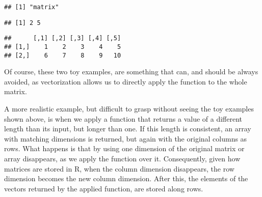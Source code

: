 \documentclass[krantz2]{krantz}\usepackage{knitr}%
\begin{document}
\begin{explainbox}
\begin{knitrout}\footnotesize
{}\color{fgcolor}\begin{kframe}
\begin{alltt}
 \hlkwb{<-} \hlstd{(}   \hlstd{=} \hlstd{,}  
\end{alltt}
\begin{verbatim}
## [1] "matrix"
\end{verbatim}
\begin{alltt}
\end{alltt}
\begin{verbatim}
## [1] 2 5
\end{verbatim}
\begin{alltt}
\end{alltt}
\begin{verbatim}
##      [,1] [,2] [,3] [,4] [,5]
## [1,]    1    2    3    4    5
## [2,]    6    7    8    9   10
\end{verbatim}
\end{kframe}
\end{knitrout}

Of course, these two toy examples, are something that can, and should be always avoided, as vectorization allows us to directly apply the function to the whole matrix.

\begin{knitrout}\footnotesize
{}\color{fgcolor}\begin{kframe}
\begin{alltt}
 \hlkwb{<-} 
\end{alltt}
\end{kframe}
\end{knitrout}

A more realistic example, but difficult to grasp without seeing the toy examples shown above, is when we apply a function that returns a value of a different length than its input, but longer than one. If this length is consistent, an array with matching dimensions is returned, but again with the original columns as rows. What happens is that by using  one dimension of the original matrix or array disappears, as we apply the function over it. Consequently, given how matrices are stored in R, when the column dimension disappears, the row dimension becomes the new column dimension. After this, the elements of the vectors returned by the applied function, are stored along rows.


\end{explainbox}
\end{document}

